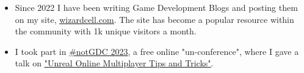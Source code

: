 

\begin{cvparagraph}

\begin{itemize}[leftmargin=*]
  \item Since 2022 I have been writing Game Development Blogs and posting them on my site, \href{https://wizardcell.com/}{\underline{wizardcell.com}}. The site has become a popular resource within the community with 1k unique visitors a month.
  \item I took part in \href{https://notgdc.io/}{\underline{\#notGDC 2023}}, a free online "un-conference", where I gave a talk on \href{https://youtu.be/ja9lhOjgmqY}{\underline{"Unreal Online Multiplayer Tips and Tricks"}}.
\end{itemize}

\end{cvparagraph}